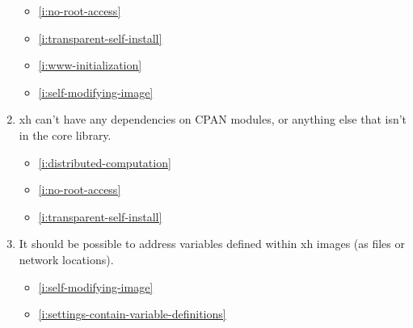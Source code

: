 \documentclass{report}
\makeatletter
\newcommand*{\Label}[2]{%
  \@bsphack
  \begingroup
    \label{#1-original}%
    \def\@currentlabel{#2 [\ref{#1-original}]}%
    \label{#1}%
  \endgroup
  \@esphack
}
\makeatother
\begin{document}
\begin{enumerate}
\begin{itemize}
\item \ref{i:no-root-access}
\item \ref{i:transparent-self-install}
\item \ref{i:www-initialization}
\item \ref{i:self-modifying-image}
\end{itemize}
\item{}\Label{i:no-perl-modules}{perlcoreonly}
  xh can't have any dependencies on CPAN modules, or anything else that
  isn't in the core library.
\begin{itemize}
\item \ref{i:distributed-computation}
\item \ref{i:no-root-access}
\item \ref{i:transparent-self-install}
\end{itemize}
\item{}\Label{i:image-merging}{imagemerging}
  It should be possible to address variables defined within xh images (as
  files or network locations).
\begin{itemize}
\item \ref{i:self-modifying-image}
\item \ref{i:settings-contain-variable-definitions}
\end{itemize}


\end{enumerate}
\end{document}
